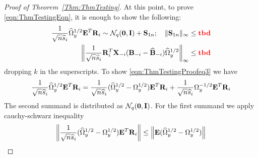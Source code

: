 \documentclass[12pt, letterpaper]{article}
\numberwithin{equation}{section}
\begin{document}
\begin{proof}[Proof of Theorem~\ref{Thm:ThmTesting}]
At this point, to prove \eqref{eqn:ThmTestingEqn}, it is enough to show the following:
%
\begin{align}
\frac{1}{\sqrt n \widehat s_i}  \widehat \Omega_y^{1/2} {\mathbf{E}}^T {\mathbf{R}}_i \sim
{\cal{N}}_q ({\bf 0}, {\mathbf{I}}) + {\mathbf{S}}_{1n}; \quad 
\| {\mathbf{S}}_{1n} \|_\infty \leq {\color{red} \bf tbd} \label{eqn:ThmTestingProofeq3}\\
\left\| \frac{1}{\sqrt n \widehat s_i} {\mathbf{R}}_i^T {\mathbf{X}}_{-i} ({\mathbf{B}}_{-i} - \widehat {{\mathbf{B}}}_{-i})
\widehat \Omega_y^{1/2} \right\|_\infty \leq {\color{red} \bf tbd} \label{eqn:ThmTestingProofeq4}
\end{align}
%
dropping $k$ in the superscripts. To show \eqref{eqn:ThmTestingProofeq3} we have
%
$$
\frac{1}{\sqrt n \widehat s_i}  \widehat \Omega_y^{1/2} {\mathbf{E}}^T {\mathbf{R}}_i =
\frac{1}{\sqrt n \widehat s_i}  (\widehat \Omega_y^{1/2} - \Omega_y^{1/2}) {\mathbf{E}}^T {\mathbf{R}}_i +
\frac{1}{\sqrt n \widehat s_i}  \Omega_y^{-1/2} {\mathbf{E}}^T {\mathbf{R}}_i
$$
%
The second summand is distributed as ${\cal{N}}_q ({\bf 0}, {\mathbf{I}})$. For the first summand we apply cauchy-schwarz inequality
%
$$
\left\| \frac{1}{\sqrt n \widehat s_i}  (\widehat \Omega_y^{1/2} - \Omega_y^{1/2}) {\mathbf{E}}^T {\mathbf{R}}_i \right\| \leq
\left\| {\mathbf{E}} (\widehat \Omega_y^{1/2} - \Omega_y^{1/2}) \right\| 
$$
\end{proof}

%

\end{document}
